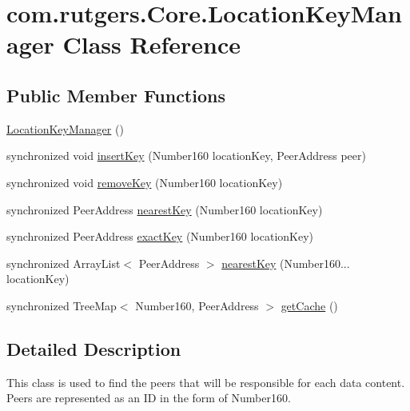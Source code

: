 \hypertarget{classcom_1_1rutgers_1_1Core_1_1LocationKeyManager}{}\section{com.\+rutgers.\+Core.\+Location\+Key\+Manager Class Reference}
\label{classcom_1_1rutgers_1_1Core_1_1LocationKeyManager}
\subsection*{Public Member Functions}
\begin{DoxyCompactItemize}
\item 
\hyperlink{classcom_1_1rutgers_1_1Core_1_1LocationKeyManager_a5b4af0b9881a71b555537e891e27417b}{Location\+Key\+Manager} ()
\item 
synchronized void \hyperlink{classcom_1_1rutgers_1_1Core_1_1LocationKeyManager_ab2468229db734743232c1495d57f418e}{insert\+Key} (Number160 location\+Key, Peer\+Address peer)
\item 
synchronized void \hyperlink{classcom_1_1rutgers_1_1Core_1_1LocationKeyManager_ad824786bd65744f1cb5eca627c4a7fe4}{remove\+Key} (Number160 location\+Key)
\item 
synchronized Peer\+Address \hyperlink{classcom_1_1rutgers_1_1Core_1_1LocationKeyManager_a228d1932314bbf29b6480ffc6eff2ae6}{nearest\+Key} (Number160 location\+Key)
\item 
synchronized Peer\+Address \hyperlink{classcom_1_1rutgers_1_1Core_1_1LocationKeyManager_ae177e62fd90497f20e2c068e236cf95d}{exact\+Key} (Number160 location\+Key)
\item 
synchronized Array\+List$<$ Peer\+Address $>$ \hyperlink{classcom_1_1rutgers_1_1Core_1_1LocationKeyManager_aee8ab17dac0b5ee588ffb29230c7a460}{nearest\+Key} (Number160... location\+Key)
\item 
synchronized Tree\+Map$<$ Number160, Peer\+Address $>$ \hyperlink{classcom_1_1rutgers_1_1Core_1_1LocationKeyManager_a89b55277112464fcb2d6c46e414e09ed}{get\+Cache} ()
\end{DoxyCompactItemize}


\subsection{Detailed Description}
This class is used to find the peers that will be responsible for each data content. Peers are represented as an ID in the form of Number160.

